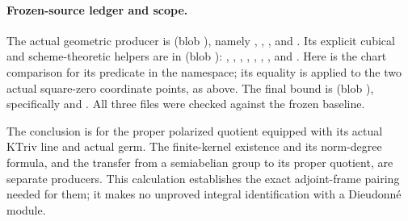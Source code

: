 \paragraph{Frozen-source ledger and scope.}
The actual geometric producer is
\href{https://github.com/ChristianKudeba/alpoge-rh-verification/blob/alpoge-source-7cbf7a0c/src/Development/AutomorphicSpectrum/Proofs/GeometryProofs/ProperGroupGermFiniteSubscheme.lean}
{}
(blob ),
namely , ,
, and .
Its explicit cubical and scheme-theoretic helpers are in
\href{https://github.com/ChristianKudeba/alpoge-rh-verification/blob/alpoge-source-7cbf7a0c/src/Development/WeilBound/CoreStatements/TorusUniformisation/ChowMahlerFamilies/KernelRankMultiplicationCharP.lean}
{}
(blob ):
, , ,
, , ,
, and .
Here  is the chart comparison for its
 predicate in the  namespace;
its equality is applied to the two actual square-zero coordinate
points, as above.
The final bound is
\href{https://github.com/ChristianKudeba/alpoge-rh-verification/blob/alpoge-source-7cbf7a0c/src/Development/AutomorphicSpectrum/Proofs/GeometryProofs/ProperMultiplicationKernel.lean}
{}
(blob ),
specifically  and
.
All three files were checked against the frozen baseline.

The conclusion is for the proper polarized quotient equipped with
its actual \(\mathrm{KTriv}\) line and actual germ.
The finite-kernel existence and its norm-degree formula, and the
transfer from a semiabelian group to its proper quotient, are
separate producers.  This calculation establishes the exact
adjoint-frame pairing needed for them; it makes no unproved
integral identification with a Dieudonn\'e module.
